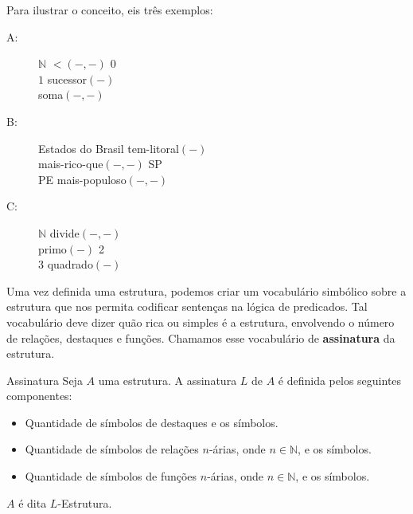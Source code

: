 Para ilustrar o conceito, eis três exemplos:
\begin{description}
    \item[A:]
     
    \begin{center}
        \begin{structure}
            {$\mathbb{N}$}
            {}
            {$<$$(-,-)$}
            {$0$\\$1$}
            {sucessor$(-)$\\soma$(-,-)$}
        \end{structure}
    \end{center} 

    \item[B:]
        \begin{center}
            \begin{structure}
                {Estados do Brasil}
                {}
                {tem-litoral$(-)$\\mais-rico-que$(-,-)$}
                {SP\\PE}
                {mais-populoso$(-,-)$}
            \end{structure}
        \end{center} 

        \item[C:]
        \begin{center}
            \begin{structure}
                {$\mathbb{N}$}
                {}
                {divide$(-,-)$\\primo$(-)$}
                {2\\3}
                {quadrado$(-)$}
            \end{structure}
        \end{center} 
\end{description}

Uma vez definida uma estrutura, podemos criar um vocabulário simbólico sobre a estrutura que nos permita codificar sentenças na lógica de predicados. Tal vocabulário deve dizer quão rica ou simples é a estrutura, envolvendo o número de relações, destaques e funções. Chamamos esse vocabulário de \textbf{assinatura} da estrutura.
\begin{definition}{Assinatura}
    Seja $A$ uma estrutura. A assinatura $L$ de $A$ é definida pelos seguintes componentes:
    \begin{itemize}
        \item Quantidade de símbolos de destaques e os símbolos.
        \item Quantidade de símbolos de relações $n$-árias, onde $n \in \mathbb{N}$, e os símbolos.
        \item Quantidade de símbolos de funções $n$-árias, onde $n \in \mathbb{N}$, e os símbolos. 
    \end{itemize}
    $A$ é dita $L$-Estrutura.
\end{definition} 

